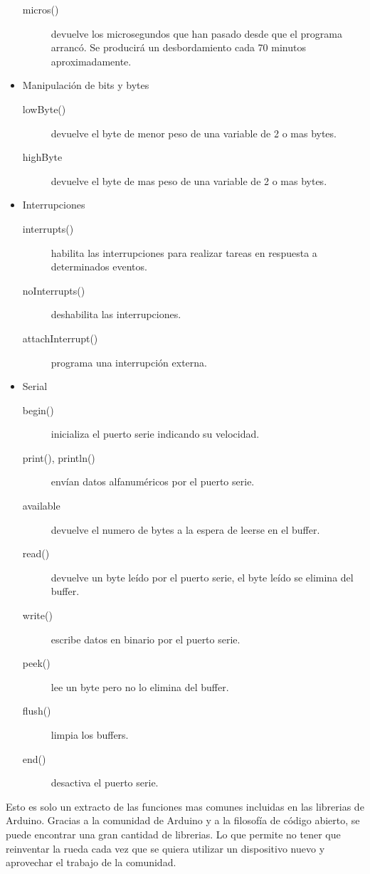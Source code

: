 \begin{itemize}
\begin{description}
            \item[micros()] devuelve los microsegundos que han pasado desde que el programa arrancó. Se producirá un desbordamiento cada 70 minutos aproximadamente.
        \end{description}
    \item Manipulación de bits y bytes
        \begin{description}
            \item[lowByte()] devuelve el byte de menor peso de una variable de 2 o mas bytes.
            \item[highByte] devuelve el byte de mas peso de una variable de 2 o mas bytes.
        \end{description}
    \item Interrupciones
        \begin{description}
            \item[interrupts()] habilita las interrupciones para realizar tareas en respuesta a determinados eventos.
            \item[noInterrupts()] deshabilita las interrupciones.
            \item[attachInterrupt()] programa una interrupción externa.
        \end{description}
    \item Serial
        \begin{description}
            \item[begin()] inicializa el puerto serie indicando su velocidad.
            \item[print(), println()] envían datos alfanuméricos por el puerto serie.
            \item[available] devuelve el numero de bytes a la espera de leerse en el buffer.
            \item[read()] devuelve un byte leído por el puerto serie, el byte leído se elimina del buffer.
            \item[write()] escribe datos en binario por el puerto serie.
            \item[peek()] lee un byte pero no lo elimina del buffer.
            \item[flush()] limpia los buffers.
            \item[end()] desactiva el puerto serie.
        \end{description}
\end{itemize}

Esto es solo un extracto de las funciones mas comunes incluidas en las librerias de Arduino. Gracias a la comunidad de Arduino y a la filosofía de código abierto, se puede encontrar una gran cantidad de librerias. Lo que permite no tener que reinventar la rueda cada vez que se quiera utilizar un dispositivo nuevo y aprovechar el trabajo de la comunidad.

